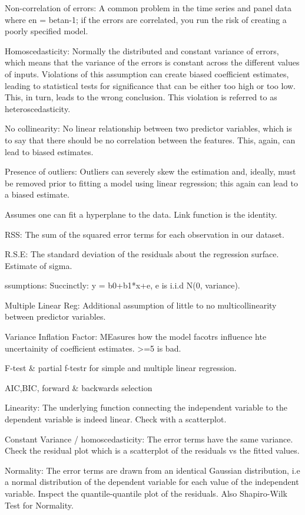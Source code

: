 \documentclass[]{book}
\theoremstyle{definition}
\theoremstyle{definition}
\theoremstyle{definition}
\theoremstyle{remark}
\begin{document}
Non-correlation of errors: A common problem in the time series and panel
data where en = betan-1; if the errors are correlated, you run the risk
of creating a poorly specified model.

Homoscedasticity: Normally the distributed and constant variance of
errors, which means that the variance of the errors is constant across
the different values of inputs. Violations of this assumption can create
biased coefficient estimates, leading to statistical tests for
significance that can be either too high or too low. This, in turn,
leads to the wrong conclusion. This violation is referred to as
heteroscedasticity.

No collinearity: No linear relationship between two predictor variables,
which is to say that there should be no correlation between the
features. This, again, can lead to biased estimates.

Presence of outliers: Outliers can severely skew the estimation and,
ideally, must be removed prior to fitting a model using linear
regression; this again can lead to a biased estimate.

Assumes one can fit a hyperplane to the data. Link function is the
identity.

RSS: The sum of the squared error terms for each observation in our
dataset.

R.S.E: The standard deviation of the residuals about the regression
surface. Estimate of sigma.

ssumptions: Succinctly: y = b0+b1*x+e, e is i.i.d N(0, variance).

Multiple Linear Reg: Additional assumption of little to no
multicollinearity between predictor variables.

Variance Inflation Factor: MEasures how the model facotrs influence hte
uncertainity of coefficient estimates. \textgreater{}=5 is bad.

F-test \& partial f-testr for simple and multiple linear regression.

AIC,BIC, forward \& backwards selection

Linearity: The underlying function connecting the independent variable
to the dependent variable is indeed linear. Check with a scatterplot.

Constant Variance / homoscedasticity: The error terms have the same
variance. Check the residual plot which is a scatterplot of the
residuals vs the fitted values.

Normality: The error terms are drawn from an identical Gaussian
distribution, i.e a normal distribution of the dependent variable for
each value of the independent variable. Inspect the quantile-quantile
plot of the residuals. Also Shapiro-Wilk Test for Normality.
\end{document}
